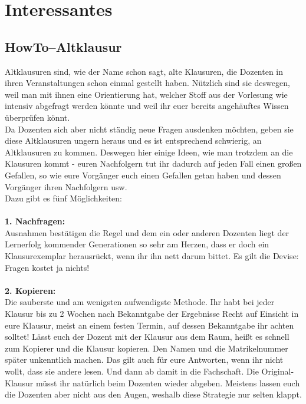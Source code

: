 \chapter{Interessantes}

\section{HowTo--Altklausur}
Altklausuren sind, wie der Name schon sagt, alte Klausuren, die Dozenten in ihren Veranstaltungen schon einmal gestellt haben. Nützlich sind sie deswegen, weil man mit ihnen eine Orientierung hat, welcher Stoff aus der Vorlesung wie intensiv abgefragt werden könnte und weil ihr euer bereits angehäuftes Wissen überprüfen könnt.\\
Da Dozenten sich aber nicht ständig neue Fragen ausdenken möchten, geben sie diese Altklausuren ungern heraus und es ist entsprechend schwierig, an Altklausuren zu kommen. Deswegen hier einige Ideen, wie man trotzdem an die Klausuren kommt - euren Nachfolgern tut ihr dadurch auf jeden Fall einen großen Gefallen, so wie eure Vorgänger euch einen Gefallen getan haben und dessen Vorgänger ihren Nachfolgern usw.\\
Dazu gibt es fünf Möglichkeiten:\\
\\
\textbf{1. Nachfragen:}\\
Ausnahmen bestätigen die Regel und dem ein oder anderen Dozenten liegt der Lernerfolg kommender Generationen so sehr am Herzen, dass er doch ein Klausurexemplar herausrückt, wenn ihr ihn nett darum bittet. Es gilt die Devise: Fragen kostet ja nichts!\\
\\
\textbf{2. Kopieren:}\\
Die sauberste und am wenigsten aufwendigste Methode. Ihr habt bei jeder Klausur bis zu 2 Wochen nach Bekanntgabe der Ergebnisse Recht auf Einsicht in eure Klausur, meist an einem festen Termin, auf dessen Bekanntgabe ihr achten solltet! Lässt euch der Dozent mit der Klausur aus dem Raum, heißt es schnell zum Kopierer und die Klausur kopieren. Den Namen und die Matrikelnummer später unkenntlich machen. Das gilt auch für eure Antworten, wenn ihr nicht wollt, dass sie andere lesen. Und dann ab damit in die Fachschaft. Die Original-Klausur müsst ihr natürlich beim Dozenten wieder abgeben. Meistens lassen euch die Dozenten aber nicht aus den Augen, weshalb diese Strategie nur selten klappt.\\
\\
